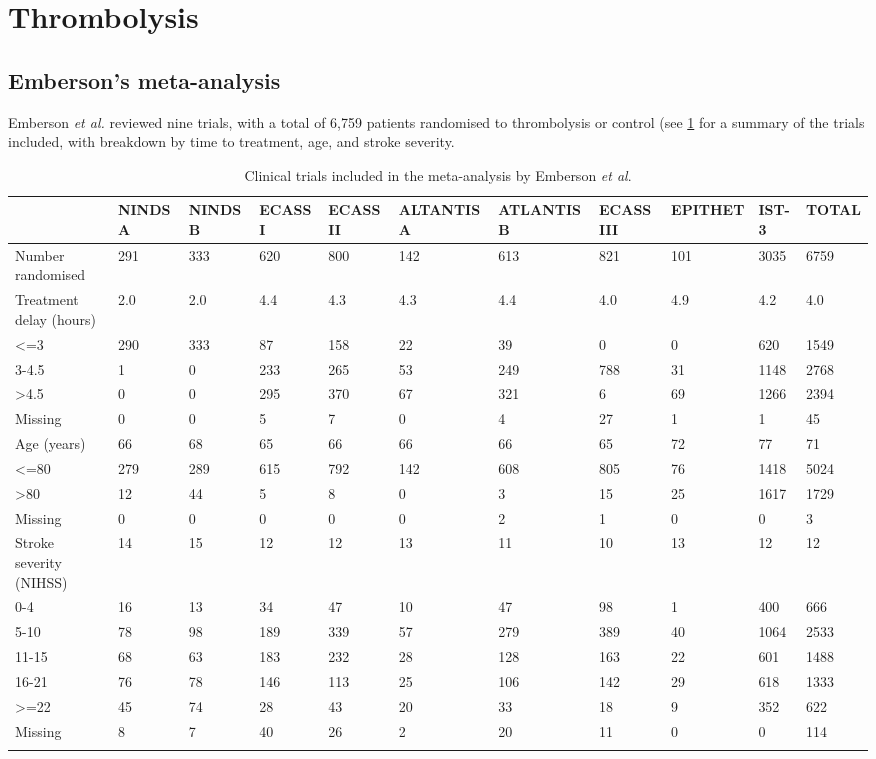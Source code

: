 \section{Thrombolysis}

\subsection{Emberson's meta-analysis}

Emberson \textit{et al.} \cite{emberson_effect_2014} reviewed nine trials, with a total of 6,759 patients randomised to thrombolysis or control (see \ref{tab:emberson_trial_info} for a summary of the trials included, with breakdown by time to treatment, age, and stroke severity.

\tiny
\begin{longtable}[]{@{}lllllllllll@{}}
\caption{Clinical trials included in the meta-analysis by Emberson \textit{et al}.}\\
\toprule
\endhead
& NINDS A & NINDS B & ECASS I & ECASS II & ALTANTIS A & ATLANTIS B & ECASS III & EPITHET & IST-3 & TOTAL \\
\midrule
Number randomised & 291 & 333 & 620 & 800 & 142 & 613 & 821 & 101 & 3035 & 6759 \\
\midrule
Treatment delay (hours) & 2.0 & 2.0 & 4.4 & 4.3 & 4.3 & 4.4 & 4.0 & 4.9 & 4.2 & 4.0 \\
\textless=3 & 290 & 333 & 87 & 158 & 22 & 39 & 0 & 0 & 620 & 1549 \\
3-4.5 & 1 & 0 & 233 & 265 & 53 & 249 & 788 & 31 & 1148 & 2768 \\
\textgreater4.5 & 0 & 0 & 295 & 370 & 67 & 321 & 6 & 69 & 1266 & 2394 \\
Missing & 0 & 0 & 5 & 7 & 0 & 4 & 27 & 1 & 1 & 45 \\
\midrule
Age (years) & 66 & 68 & 65 & 66 & 66 & 66 & 65 & 72 & 77 & 71 \\
\textless=80 & 279 & 289 & 615 & 792 & 142 & 608 & 805 & 76 & 1418 & 5024 \\
\textgreater80 & 12 & 44 & 5 & 8 & 0 & 3 & 15 & 25 & 1617 & 1729 \\
Missing & 0 & 0 & 0 & 0 & 0 & 2 & 1 & 0 & 0 & 3 \\
\midrule
Stroke severity (NIHSS) & 14 & 15 & 12 & 12 & 13 & 11 & 10 & 13 & 12 & 12 \\
0-4 & 16 & 13 & 34 & 47 & 10 & 47 & 98 & 1 & 400 & 666 \\
5-10 & 78 & 98 & 189 & 339 & 57 & 279 & 389 & 40 & 1064 & 2533 \\
11-15 & 68 & 63 & 183 & 232 & 28 & 128 & 163 & 22 & 601 & 1488 \\
16-21 & 76 & 78 & 146 & 113 & 25 & 106 & 142 & 29 & 618 & 1333 \\
\textgreater=22 & 45 & 74 & 28 & 43 & 20 & 33 & 18 & 9 & 352 & 622 \\
Missing & 8 & 7 & 40 & 26 & 2 & 20 & 11 & 0 & 0 & 114 \\
\bottomrule
\label{tab:emberson_trial_info}
\end{longtable}


\normalsize